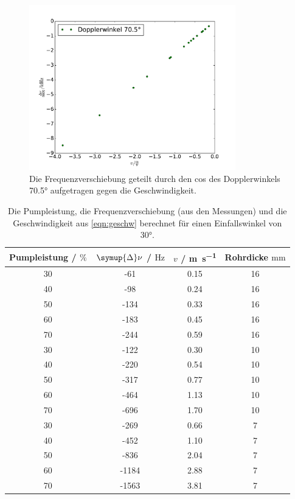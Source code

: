 \documentclass[
  bibliography=totoc,     %
  captions=tableheading,  %
  titlepage=firstiscover, %
]{scrartcl}
\begin{document}
      \begin{figure}
      \centering
        \includegraphics[width=0.8\textwidth]{a30.pdf}
        \caption{Die Frequenzverschiebung geteilt durch den cos des
        Dopplerwinkels 70.5° aufgetragen gegen die Geschwindigkeit.}
        \label{fig:2}
    \end{figure}
    \begin{table}
      \centering
      \begin{tabular}{c c c c}
        \toprule
        Pumpleistung / $\%$ & $\symup{\Delta} \nu$ / $\si{\hertz}$ & $v$ /
        \si{\meter\per\second} & Rohrdicke $\si{\milli\meter}$ \\
        \midrule
        30 & -61 & 0.15 & 16\\
        40 & -98 & 0.24 & 16\\
        50 & -134 & 0.33 & 16\\
        60 & -183 & 0.45 & 16\\
        70 & -244 & 0.59 & 16\\
        30 & -122 & 0.30 & 10\\
        40 & -220 & 0.54 & 10\\
        50 & -317 & 0.77 & 10\\
        60 & -464 & 1.13 & 10\\
        70 & -696 & 1.70 & 10\\
        30 & -269 & 0.66 & 7\\
        40 & -452 & 1.10 & 7\\
        50 & -836 & 2.04 & 7\\
        60 & -1184 & 2.88 & 7\\
        70 & -1563 & 3.81 & 7\\
      \bottomrule
      \end{tabular}
      \caption{Die Pumpleistung, die Frequenzverschiebung (aus den Messungen)
      und die Geschwindigkeit aus \eqref{eqn:geschw} berechnet für einen
      Einfallswinkel von 30°.}
      \label{tab:3}
    \end{table}
\end{document}
